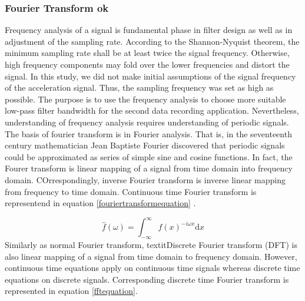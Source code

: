 \documentclass[english,12pt,a4paper,pdftex,elec,utf8]{aaltothesis}
\begin{document}
\subsubsection{Fourier Transform ok} \label{fouriertransformsection}

Frequency analysis of a signal is fundamental phase in filter design as well as in adjustment of the sampling rate. According to the Shannon-Nyquist theorem, the minimum sampling rate shall be at least twice the signal frequency. Otherwise, high frequency components may fold over the lower frequencies and distort the signal. In this study, we did not make initial assumptions of the signal frequency of the acceleration signal. Thus, the sampling frequency was set as high as possible. The purpose is to use the frequency analysis to choose more suitable low-pass filter bandwidth for the second data recording application. Nevertheless, understanding of frequency analysis requires understanding of periodic signals. The basis of fourier transform is in Fourier analysis. That is, in the seventeenth century mathematician Jean Baptiste Fourier discovered that periodic signals could be approximated as series of simple sine and cosine functions. In fact, the Fourer transform is linear mapping of a signal from time domain into frequency domain. COrrespondingly, inverse Fourier transform is inverse linear mapping from frequency to time domain. Continuous time Fourier transform is representend in equation \ref{fouriertransformequation} \cite{khan2005digital}. 


\begin{equation} \label{fouriertransformequation}
\hat{f}(\omega) =  \int_{- \infty} ^{\infty} f(x) ^{-i\omega x} \mathrm{d}x
\end{equation}  
Similarly as normal Fourier transform, textit{Discrete Fourier transform (DFT)} is also linear mapping of a signal from time domain to frequency domain. However, continuous time equations apply on continuous time signals whereas discrete time equations on discrete signals. Corresponding discrete time Fourier transform is represented in equation \ref{fftequation}.
\end{document}
